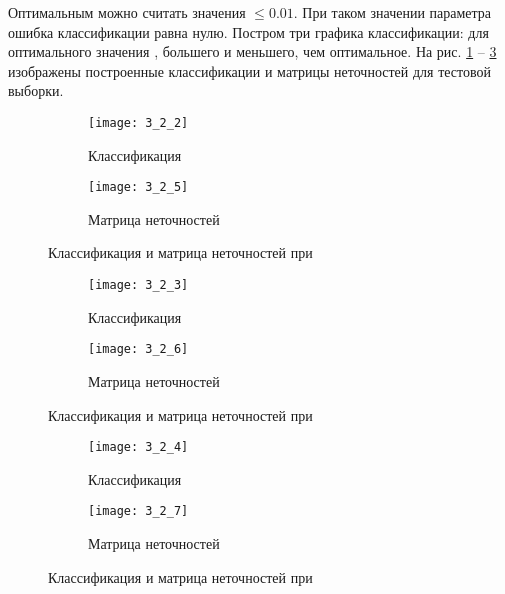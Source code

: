 Оптимальным можно считать значения  $\leq 0.01$. При таком значении параметра ошибка классификации равна нулю. Постром три графика классификации: для оптимального значения , большего и меньшего, чем оптимальное. На рис. \ref{fig:3_2_2} -- \ref{fig:3_2_4} изображены построенные классификации и матрицы неточностей для тестовой выборки.
\begin{figure}[H]
\begin{center}
	\begin{subfigure}{0.49\textwidth}
		\texttt{[image: 3\_2\_2]}
		\caption{Классификация}
	\end{subfigure}
	\begin{subfigure}{0.49\textwidth}
		\texttt{[image: 3\_2\_5]}
		\caption{Матрица неточностей}
	\end{subfigure}
	\caption{Классификация и матрица неточностей при }
	\label{fig:3_2_2}
\end{center}
\end{figure}

\begin{figure}[H]
\begin{center}
	\begin{subfigure}{0.49\textwidth}
		\texttt{[image: 3\_2\_3]}
		\caption{Классификация}
	\end{subfigure}
	\begin{subfigure}{0.49\textwidth}
		\texttt{[image: 3\_2\_6]}
		\caption{Матрица неточностей}
	\end{subfigure}
	\caption{Классификация и матрица неточностей при }
	\label{fig:3_2_3}
\end{center}
\end{figure}


\begin{figure}[H]
\begin{center}
	\begin{subfigure}{0.49\textwidth}
		\texttt{[image: 3\_2\_4]}
		\caption{Классификация}
	\end{subfigure}
	\begin{subfigure}{0.49\textwidth}
		\texttt{[image: 3\_2\_7]}
		\caption{Матрица неточностей}
	\end{subfigure}
	\caption{Классификация и матрица неточностей при }
	\label{fig:3_2_4}
\end{center}
\end{figure}


